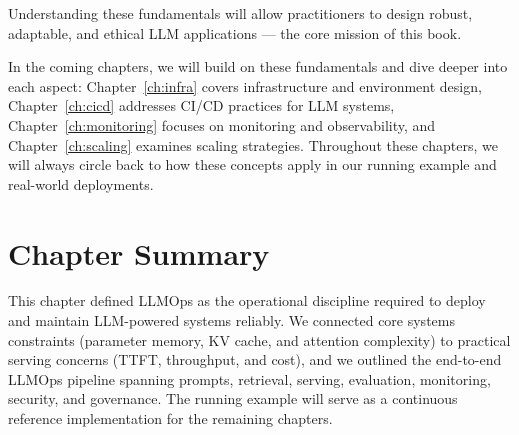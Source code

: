 Understanding these fundamentals will allow practitioners to design robust, adaptable, and ethical LLM applications — the core mission of this book.

In the coming chapters, we will build on these fundamentals and dive deeper into each aspect: Chapter~\ref{ch:infra} covers infrastructure and environment design, Chapter~\ref{ch:cicd} addresses CI/CD practices for LLM systems, Chapter~\ref{ch:monitoring} focuses on monitoring and observability, and Chapter~\ref{ch:scaling} examines scaling strategies. Throughout these chapters, we will always circle back to how these concepts apply in our running example and real-world deployments.





\section*{Chapter Summary}
This chapter defined LLMOps as the operational discipline required to deploy and maintain LLM-powered systems reliably.
We connected core systems constraints (parameter memory, KV cache, and attention complexity) to practical serving concerns
(TTFT, throughput, and cost), and we outlined the end-to-end LLMOps pipeline spanning prompts, retrieval, serving, evaluation,
monitoring, security, and governance. The \ishtar{} running example will serve as a continuous reference implementation for
the remaining chapters.

\printbibliography[
  heading=subbibliography,
  segment=\therefsegment,
  resetnumbers=true
]

